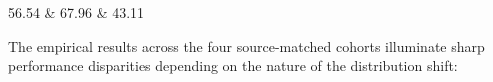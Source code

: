 \begin{table}[!t]
\begin{tabular}
56.54
& 67.96     
& 43.11      \\
\bottomrule
\end{tabular}
\end{table}



The empirical results across the four source-matched cohorts illuminate sharp performance disparities depending on the nature of the distribution shift:
